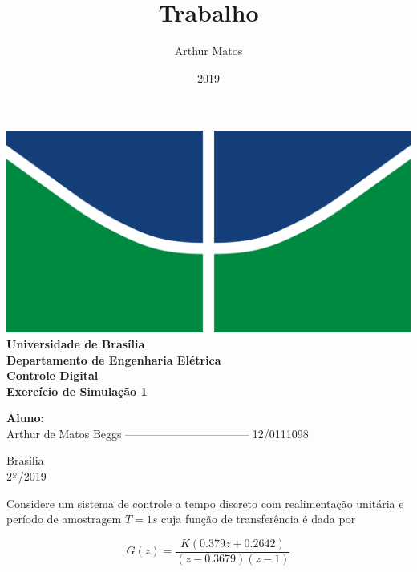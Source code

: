 \documentclass{article}
\title{Trabalho}
\author{Arthur Matos}
\date{2019}
\newcommand{\ubar}[1]{\underaccent{\bar}{#1}}
\begin{document}
\begin{titlepage}
    \begin{center}
        \centering
        \includegraphics[width=.7\linewidth]{images/logo_unb.png}\\[0.5cm]
        {\large \textbf{Universidade de Brasília}}\\[0.2cm]
        {\large \textbf{Departamento de Engenharia Elétrica}}\\[0.2cm]
        {\large \textbf{Controle Digital}}\\[4.8cm]
        {\bf \huge {Exercício de Simulação 1}}\\[0.2cm]
        {\bf \large {}}
    \end{center}

    \vspace{5cm}
    \hspace{2cm} {\noindent \bf \large {Aluno:}}\\
    \vspace{0.8cm}
    \hspace{2.35cm} {\large Arthur de Matos Beggs --------------------------------- 12/0111098}\\[1cm]

    \begin{center}
        {\large Brasília}\\
        {\large 2$^{\ubar{\circ}}$/2019}
    \end{center}

\end{titlepage}
\clearpage
\setcounter{page}{2}
\clearpage



{\Large \bf {
    Considere um sistema de controle a tempo discreto com realimentação
    unitária e período de amostragem $ T = 1s $ cuja função de transferência é
    dada por

    \[ G(z) = \frac{K(0.379z + 0.2642)}{(z-0.3679)(z-1)} \]
}}
\end{document}
